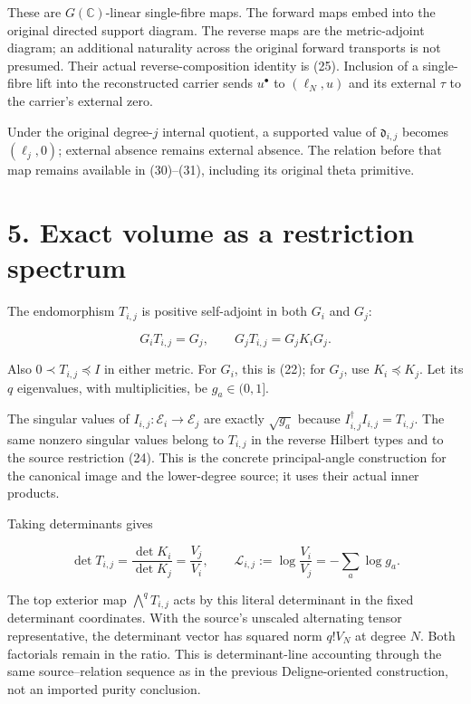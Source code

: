 \documentclass[
  11pt,
]{article}
\begin{document}
These are \(G(\mathbb C)\)-linear single-fibre maps. The forward maps
embed into the original directed support diagram. The reverse maps are
the metric-adjoint diagram; an additional naturality across the original
forward transports is not presumed. Their actual reverse-composition
identity is (25). Inclusion of a single-fibre lift into the
reconstructed carrier sends \(u^\bullet\) to \((\ell_N,u)\) and its
external \(\tau\) to the carrier's external zero.

Under the original degree-\(j\) internal quotient, a supported value of
\(\mathfrak d_{i,j}\) becomes \((\ell_j,0)\); external absence remains
external absence. The relation before that map remains available in
(30)--(31), including its original theta primitive.

\section{5. Exact volume as a restriction
spectrum}\label{exact-volume-as-a-restriction-spectrum}

The endomorphism \(T_{i,j}\) is positive self-adjoint in both \(G_i\)
and \(G_j\):

\[
 G_iT_{i,j}=G_j,\qquad
 G_jT_{i,j}=G_jK_iG_j.                                           \tag{33}
\]

Also \(0\prec T_{i,j}\preceq I\) in either metric. For \(G_i\), this is
(22); for \(G_j\), use \(K_i\preceq K_j\). Let its \(q\) eigenvalues,
with multiplicities, be \(g_a\in(0,1]\).

The singular values of \(I_{i,j}:\mathscr E_i\to\mathscr E_j\) are
exactly \(\sqrt{g_a}\) because \(I_{i,j}^\dagger I_{i,j}=T_{i,j}\). The
same nonzero singular values belong to \(T_{i,j}\) in the reverse
Hilbert types and to the source restriction (24). This is the concrete
principal-angle construction for the canonical image and the
lower-degree source; it uses their actual inner products.

Taking determinants gives

\[
 \boxed{\det T_{i,j}=\frac{\det K_i}{\det K_j}
 =\frac{V_j}{V_i},\qquad
 \mathcal L_{i,j}:=\log\frac{V_i}{V_j}=-\sum_a\log g_a.}          \tag{34}
\]

The top exterior map \(\bigwedge^qT_{i,j}\) acts by this literal
determinant in the fixed determinant coordinates. With the source's
unscaled alternating tensor representative, the determinant vector has
squared norm \(q!V_N\) at degree \(N\). Both factorials remain in the
ratio. This is determinant-line accounting through the same
source--relation sequence as in the previous Deligne-oriented
construction, not an imported purity conclusion.
\end{document}
